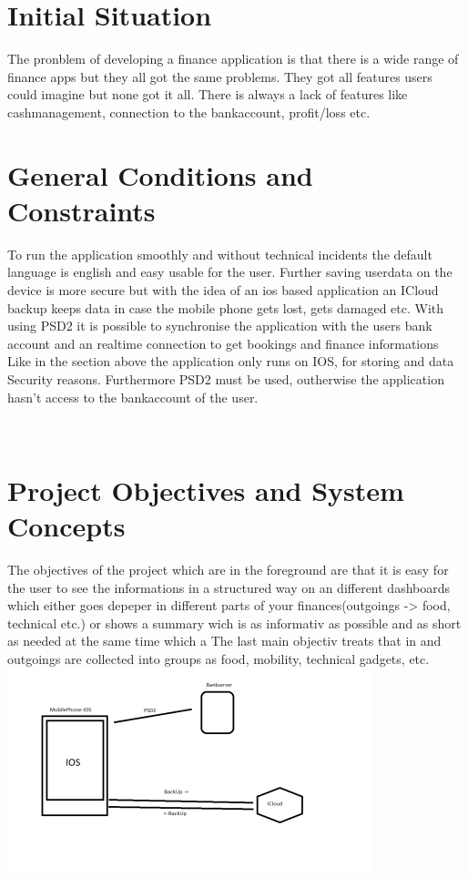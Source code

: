 \documentclass[12pt]{article}
\theoremstyle{definition}
\begin{document}
\section{Initial Situation}

The pronblem of developing a finance application is that there is a wide range of finance apps but they all got the same problems.
They got all features users could imagine but none got it all.
 There is always a lack of features like cashmanagement, connection to the bankaccount, profit/loss etc.

\pagebreak

\section{General Conditions and Constraints}

To run the application smoothly and without technical incidents
the default language is english and easy usable for the user.
Further saving userdata on the device is more secure but with the idea of an ios based application an ICloud backup keeps data in case the mobile phone gets lost, gets damaged etc.
With using PSD2 it is possible to synchronise the application with the users bank account and an realtime connection to get bookings and finance informations
\\

Like in the section above the application only runs on IOS, for storing and data Security reasons. Furthermore PSD2 must be used, outherwise the application hasn't access to the bankaccount of the user.

\\

\pagebreak

\section{Project Objectives and System Concepts}

The objectives of the project which are in the foreground are that 
it is easy for the user to see the informations in a structured way on an different dashboards which either goes depeper in different parts of your finances(outgoings -> food, technical etc.) or 
shows a summary wich is as informativ as possible and as short as needed at the same time which a
The last main objectiv treats that in and outgoings are collected into groups as food, mobility, technical gadgets, etc. 
\\
\includegraphics[scale=1.2]{Organisation.png}
\end{document}
